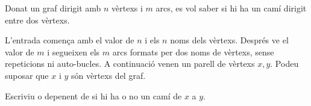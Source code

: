 

\Statement


Donat un graf dirigit amb $n$ vèrtexs i $m$ arcs,
es vol saber si hi ha un camí dirigit entre dos vèrtexs.


\Input

L'entrada comença amb el valor de $n$ i els $n$ noms dels vèrtexs.
Després ve el valor de $m$ i segueixen els $m$ arcs
formats per dos noms de vèrtexs, sense repeticions
ni auto-bucles. A continuació venen un parell
de vèrtexs $x,y$. Podeu suposar que $x$ i $y$ són vèrtexs del graf.


\Output


Escriviu  o 
depenent de si hi ha o no un camí de $x$ a $y$.


\Sample

